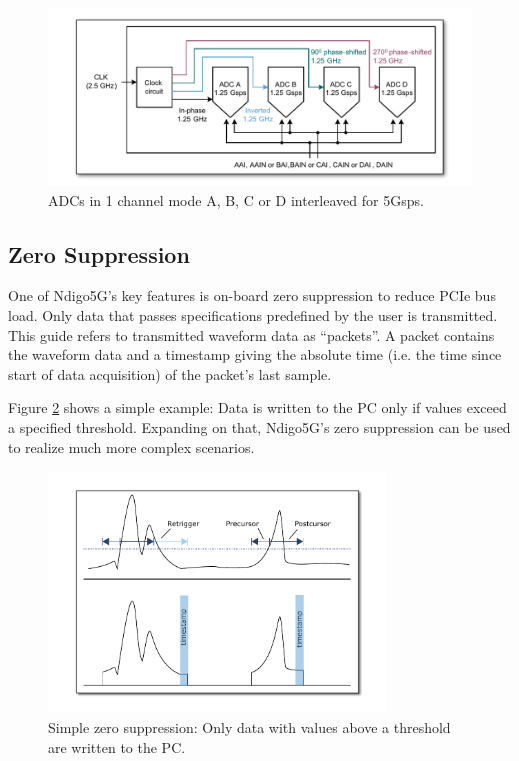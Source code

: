 		\begin{figure}[hb]
			\begin{center}
				\includegraphics[width=\textwidth]{figures/1ChannelMode.pdf}
				\caption{ADCs in 1 channel mode A, B, C or D interleaved for 5Gsps.\label{fig:1ChannelMode}}
			\end{center}
		\end{figure}
		
	\subsection{Zero Suppression}
	
		One of Ndigo5G's key features is on-board zero suppression to reduce PCIe bus load. Only data that passes specifications predefined by the user is transmitted. This guide refers to transmitted waveform data as ``packets''. A packet contains the waveform data and a timestamp giving the absolute time (i.e. the time since start of data acquisition) of the packet's last sample.\par
Figure \ref{fig:ZeroSupp} shows a simple example: Data is written to the PC only if values exceed a specified threshold. Expanding on that, Ndigo5G's zero suppression can be used to realize much more complex scenarios.

		\begin{figure}[hb]
			\begin{center}
				\includegraphics[width=0.8\textwidth]{figures/ZeroSupp.pdf}
				\caption{Simple zero suppression: Only data with values above a threshold are
written to the PC.\label{fig:ZeroSupp}}
			\end{center}
		\end{figure}
	
